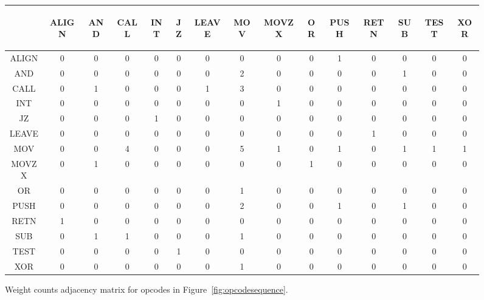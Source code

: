 \begin{figure}[h]
  \centering
\begin{tabular}{c|cccccccccccccc}
  & \begin{sideways}ALIGN\end{sideways}  & \begin{sideways}AND\end{sideways}  & \begin{sideways}CALL\end{sideways}  & \begin{sideways}INT\end{sideways}  & \begin{sideways}JZ\end{sideways}  & \begin{sideways}LEAVE\end{sideways}  & \begin{sideways}MOV\end{sideways}  & \begin{sideways}MOVZX\end{sideways}  & \begin{sideways}OR\end{sideways}  & \begin{sideways}PUSH\end{sideways}  & \begin{sideways}RETN\end{sideways}  & \begin{sideways}SUB\end{sideways}  & \begin{sideways}TEST\end{sideways}  & \begin{sideways}XOR\end{sideways} \\
 \midrule
ALIGN&  0& 0& 0& 0&  0& 0& 0&  0& 0&1& 0&0&  0&0 \\
AND& 0&0&0&0&  0&0& 2&  0& 0&0& 0&1&  0&0 \\
CALL&0&1&0&0&  0&1& 3&  0& 0&0& 0&0&  0&0 \\
INT& 0&0&0&0&  0&0& 0&  1& 0&0& 0&0&  0&0 \\
JZ&  0&0&0&1&  0&0& 0&  0& 0&0& 0&0&  0&0 \\
LEAVE&  0&0&0&0&  0&0& 0&  0& 0&0& 1&0&  0&0 \\
MOV& 0&0&4&0&  0&0& 5&  1& 0&1& 0&1&  1&1 \\
MOVZX&  0&1&0&0&  0&0& 0&  0& 1&0& 0&0&  0&0 \\
OR&  0&0&0&0&  0&0& 1&  0& 0&0& 0&0&  0&0 \\
PUSH& 0&0&0&0&  0&0& 2&  0& 0&1& 0&1&  0&0 \\
RETN&1&0&0&0&  0&0& 0&  0& 0&0& 0&0&  0&0 \\
SUB& 0&1&1&0&  0&0& 1&  0& 0&0& 0&0&  0&0 \\
TEST&0&0&0&0&  1&0& 0&  0& 0&0& 0&0&  0&0 \\
XOR& 0&0&0&0&  0&0& 1&  0& 0&0& 0&0&  0&0 \\
\end{tabular}
    \caption[Weight counts adjacency matrix for opcode sequence]{Weight counts adjacency matrix for opcodes in Figure~\ref{fig:opcodesequence}.}
    \label{fig:weightcounts}
\end{figure}

